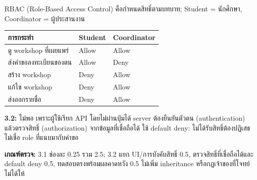 RBAC (Role-Based Access Control) คือกำหนดสิทธิ์ตามบทบาท; Student = นักศึกษา, Coordinator = ผู้ประสานงาน\par
\begin{tabularx}{\linewidth}{|Y|C{2.8cm}|C{2.8cm}|}\hline
การกระทำ & Student & Coordinator\\\hline
ดู workshop ที่เผยแพร่ & Allow & Allow\\\hline
ส่งคำขอลงทะเบียนของตน & Allow & Deny\\\hline
สร้าง workshop & Deny & Allow\\\hline
แก้ไข workshop & Deny & Allow\\\hline
ส่งออกรายชื่อ & Deny & Allow\\\hline
\end{tabularx}
\textbf{3.2:} ไม่พอ เพราะผู้ใช้เรียก API โดยไม่ผ่านปุ่มได้ server ต้องยืนยันตัวตน (authentication) แล้วตรวจสิทธิ์ (authorization) จากข้อมูลที่เชื่อถือได้ ใช้ default deny: ไม่ได้รับสิทธิ์ต้องปฏิเสธ ไม่เชื่อ role ที่แนบมากับคำขอ\par
{}
\textbf{เกณฑ์ตรวจ:} 3.1 ช่องละ 0.25 รวม 2.5; 3.2 แยก UI/การบังคับสิทธิ์ 0.5, ตรวจสิทธิ์ที่เชื่อถือได้และ default deny 0.5, ทดสอบตรงพร้อมผลคาดหวัง 0.5 ไม่เพิ่ม inheritance หรือกฎเจ้าของที่โจทย์ไม่ได้ให้

